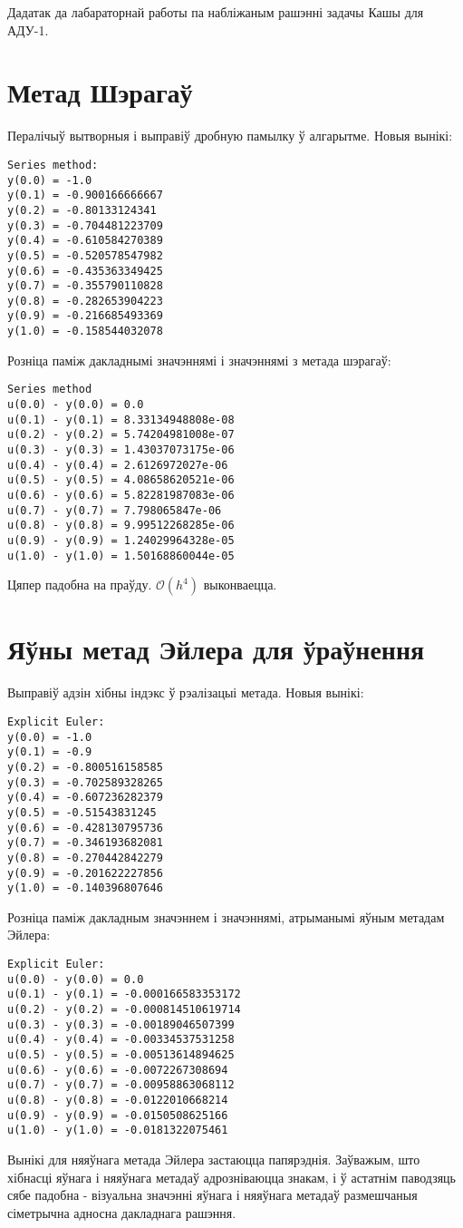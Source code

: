 \documentclass{article}
\begin{document}
Дадатак да лабараторнай работы па набліжаным рашэнні задачы Кашы для АДУ-1.
\section*{Метад Шэрагаў}
Пералічыў вытворныя і выправіў дробную памылку ў алгарытме. Новыя вынікі:
{\small
\begin{verbatim}
Series method:
y(0.0) = -1.0
y(0.1) = -0.900166666667
y(0.2) = -0.80133124341
y(0.3) = -0.704481223709
y(0.4) = -0.610584270389
y(0.5) = -0.520578547982
y(0.6) = -0.435363349425
y(0.7) = -0.355790110828
y(0.8) = -0.282653904223
y(0.9) = -0.216685493369
y(1.0) = -0.158544032078
\end{verbatim}
}
Розніца паміж дакладнымі значэннямі і значэннямі з метада шэрагаў:
{\small
\begin{verbatim}
Series method
u(0.0) - y(0.0) = 0.0
u(0.1) - y(0.1) = 8.33134948808e-08
u(0.2) - y(0.2) = 5.74204981008e-07
u(0.3) - y(0.3) = 1.43037073175e-06
u(0.4) - y(0.4) = 2.6126972027e-06
u(0.5) - y(0.5) = 4.08658620521e-06
u(0.6) - y(0.6) = 5.82281987083e-06
u(0.7) - y(0.7) = 7.798065847e-06
u(0.8) - y(0.8) = 9.99512268285e-06
u(0.9) - y(0.9) = 1.24029964328e-05
u(1.0) - y(1.0) = 1.50168860044e-05
\end{verbatim}
}
Цяпер падобна на праўду. $\mathcal{O}(h^4)$ выконваецца.

\section*{Яўны метад Эйлера для ўраўнення}
Выправіў адзін хібны індэкс ў рэалізацыі метада. Новыя вынікі:
{\small
\begin{verbatim}
Explicit Euler:
y(0.0) = -1.0
y(0.1) = -0.9
y(0.2) = -0.800516158585
y(0.3) = -0.702589328265
y(0.4) = -0.607236282379
y(0.5) = -0.51543831245
y(0.6) = -0.428130795736
y(0.7) = -0.346193682081
y(0.8) = -0.270442842279
y(0.9) = -0.201622227856
y(1.0) = -0.140396807646
\end{verbatim}
}
Розніца паміж дакладным значэннем і значэннямі, атрыманымі яўным метадам Эйлера:
{\small
\begin{verbatim}
Explicit Euler:
u(0.0) - y(0.0) = 0.0
u(0.1) - y(0.1) = -0.000166583353172
u(0.2) - y(0.2) = -0.000814510619714
u(0.3) - y(0.3) = -0.00189046507399
u(0.4) - y(0.4) = -0.00334537531258
u(0.5) - y(0.5) = -0.00513614894625
u(0.6) - y(0.6) = -0.0072267308694
u(0.7) - y(0.7) = -0.00958863068112
u(0.8) - y(0.8) = -0.0122010668214
u(0.9) - y(0.9) = -0.0150508625166
u(1.0) - y(1.0) = -0.0181322075461
\end{verbatim}
}
Вынікі для няяўнага метада Эйлера застаюцца папярэднія. Заўважым, што хібнасці яўнага і няяўнага метадаў адрозніваюцца знакам, і ў астатнім паводзяць сябе падобна - візуальна значэнні яўнага і няяўнага метадаў размешчаныя сіметрычна адносна дакладнага рашэння.
\end{document}
